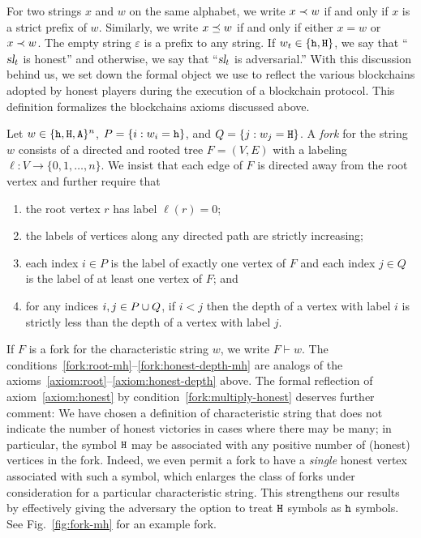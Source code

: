 For two strings $x$ and $w$ on the same alphabet, 
we write $x \prec w$ if and only if $x$ is a strict prefix of $w$. 
Similarly, 
we write $x \preceq w$ if and only if either $x = w$ or $x \prec w$. 
The empty string $\varepsilon$ is a prefix to any string. 
If $w_t \in \{\mathtt{h}, \mathtt{H}\}$, we say that ``$\textsl{sl}_t$ is honest'' and 
otherwise, we say that ``$\textsl{sl}_t$ is adversarial.'' 
With this discussion behind us, we set down the formal object we use
to reflect the various blockchains adopted by honest players during
the execution of a blockchain protocol. This definition formalizes the blockchains axioms discussed above.


\begin{definition}[Fork]\label{def:fork}
  Let $w\in \{\mathtt{h}, \mathtt{H}, \mathtt{A}\}^n$, $P = \{ i : w_i = \mathtt{h}\}$, and $Q = \{ j : w_j = \mathtt{H}\}$. 
  A \emph{fork} for the string $w$ consists of a directed and rooted
  tree $F=(V,E)$ with a labeling $\ell:V\to\{0,1,\dots,n\}$. We insist
  that each edge of $F$ is directed away from the root vertex and
  further require that
  \begin{enumerate}[label=(F{\arabic*})]
    \item\label{fork:root-mh} the root vertex $r$ has label $\ell(r)=0$;

    \item\label{fork:monotone-mh} the labels of vertices along any directed path are strictly increasing;

    \item\label{fork:unique-honest-mh}\label{fork:multiply-honest}
    each index $i\in P$ 
    is the label of exactly one vertex of $F$ 
    and 
    each index $j\in Q$ 
    is the label of at least one vertex of $F$; and 

    \item\label{fork:honest-depth-mh} 
    for any indices $i,j\in P \cup Q$, 
    if $i<j$ then 
    the depth of a vertex with label $i$ 
    is strictly less than 
    the depth of a vertex with label $j$.
  \end{enumerate}
\end{definition}

If $F$ is a fork for the characteristic string $w$, we write
$F\vdash w$.  The conditions~\ref{fork:root-mh}--\ref{fork:honest-depth-mh}
are analogs of the axioms~\ref{axiom:root}--\ref{axiom:honest-depth}
above. The formal reflection of axiom~\ref{axiom:honest} by
condition~\ref{fork:multiply-honest} deserves further comment: We have
chosen a definition of characteristic string that does not indicate
the number of honest victories in cases where there may be many; in
particular, the symbol $\mathtt{H}$ may be associated with any positive number
of (honest) vertices in the fork. Indeed, we even permit a fork to
have a \emph{single} honest vertex associated with such a symbol,
which enlarges the class of forks under consideration for a particular
characteristic string. This strengthens our results by effectively
giving the adversary the option to treat $\mathtt{H}$ symbols as $\mathtt{h}$
symbols. See Fig.~\ref{fig:fork-mh}
for an example fork. 

